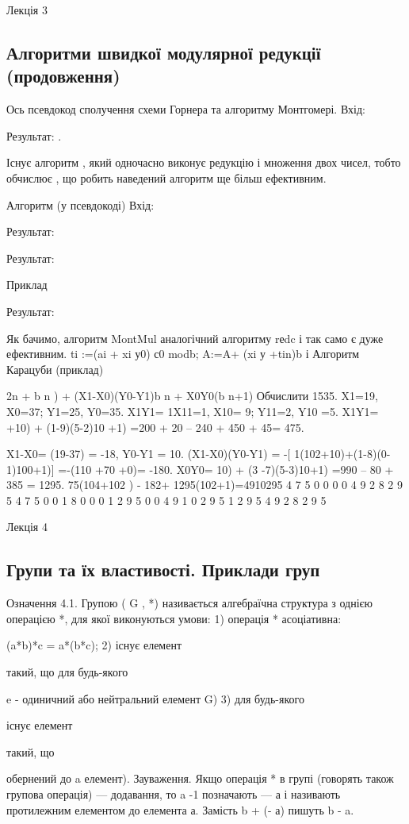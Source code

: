 Лекція 3

\subsection{Алгоритми швидкої модулярної редукції (продовження)}

Ось псевдокод сполучення схеми Горнера та алгоритму Монтгомері.
Вхід: 

Результат: .

Існує алгоритм , який одночасно виконує редукцію і
множення двох чисел, тобто обчислює , що робить наведений алгоритм
ще більш ефективним.

Алгоритм  (у псевдокоді)
Вхід:

Результат:

Результат:

Приклад

Результат:

Як бачимо, алгоритм MontMul аналогічний алгоритму rеdc і так само є
дуже ефективним.
ti :=(ai + xi у0) с0 modb;
A:=A+ (xi у +tin)b
і
Алгоритм Карацуби (приклад)

2n + b
n
) + (X1-X0)(Y0-Y1)b
n + X0Y0(b
n+1)
Обчислити 1535. X1=19, X0=37; Y1=25, Y0=35.
X1Y1= 1X11=1, X10= 9; Y11=2, Y10 =5.
X1Y1= +10) + (1-9)(5-2)10 +1) =200 + 20 – 240 + 450 + 45= 475.

X1-X0= (19-37) = -18, Y0-Y1 = 10.
(X1-X0)(Y0-Y1) = -[ 1(102+10)+(1-8)(0-1)100+1)] =-(110 +70 +0)= -180.
X0Y0= 10) + (3 -7)(5-3)10+1) =990 – 80 + 385 = 1295.
75(104+102
) - 182+ 1295(102+1)=4910295
4 7 5 0 0 0 0 4 9 2 8 2 9 5
 4 7 5 0 0 1 8 0 0 0
 1 2 9 5 0 0 4 9 1 0 2 9 5
 1 2 9 5
4 9 2 8 2 9 5

Лекція 4

\subsection{Групи та їх властивості. Приклади груп}

Означення 4.1. Групою (
G
, *) називається алгебраїчна
структура з однією операцією *, для якої виконуються умови:
1) операція * асоціативна:

 (a*b)*c = a*(b*c);
2) існує елемент

такий, що для будь-якого

e - одиничний або нейтральний елемент G)
3) для будь-якого

існує елемент


такий, що

обернений до
a
елемент).
Зауваження. Якщо операція * в групі (говорять також групова
операція) --- додавання, то a
-1 позначають --- а і називають
протилежним елементом до елемента а. Замість b + (- а) пишуть
b - a.

